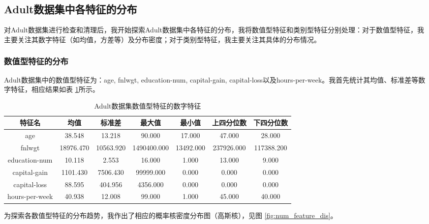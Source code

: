 \documentclass[12pt,a4paper]{article}
\theoremstyle{definition}
\begin{document}
\subsection{Adult数据集中各特征的分布}

对Adult数据集进行检查和清理后，我开始探索Adult数据集中各特征的分布，我将数值型特征和类别型特征分别处理：对于数值型特征，我主要关注其数字特征（如均值，方差等）及分布密度；对于类别型特征，我主要关注其具体的分布情况。

\subsubsection{数值型特征的分布}

Adult数据集中的数值型特征为：age, fnlwgt, education-num, capital-gain, capital-loss以及hours-per-week。我首先统计其均值、标准差等数字特征，相应结果如表 \ref{tab:num_feature_avg}所示。

\begin{table}[H]
	\renewcommand\arraystretch{1.35}
	\caption{Adult数据集数值型特征的数字特征}
	\label{tab:num_feature_avg}
	\centering
	
	\begin{tabular}{c|c|c|c|c|c|c}
		\centering
		 特征名 &  均值 & 标准差 & 最大值 & 最小值 &  上四分位数 & 下四分位数 \\
		\hline
		\hline
		age & 38.548 & 13.218 & 90.000 & 17.000 & 47.000 & 28.000 \\
		fnlwgt & 18976.470 & 10563.920 & 1490400.000 & 13492.000 & 237926.000 & 117388.200 \\
		education-num & 10.118 & 2.553 & 16.000 & 1.000 & 13.000 & 9.000 \\
		capital-gain & 1101.430 & 7506.430 & 99999.000 & 0.000 & 0.000 & 0.000 \\
		capital-loss & 88.595 & 404.956 & 4356.000 & 0.000 & 0.000 & 0.000 \\
		hours-per-week & 40.938 & 12.008 & 99.000 & 1.000 & 45.000 & 40.000 \\

	\end{tabular}
\end{table}

为探索各数值型特征的分布趋势，我作出了相应的概率核密度分布图（高斯核），见图 \ref{fig:num_feature_dis}。
\end{document}
